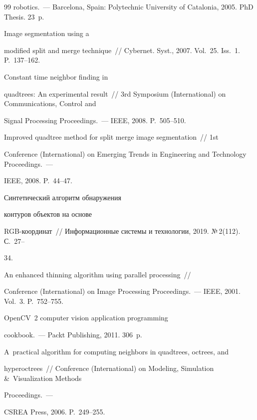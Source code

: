 {{\begin{thebibliography}{99}
robotics.~--- Barcelona, Spain: Polytechnic University of Catalonia, 2005.  PhD Thesis. 23~p.


 Image segmentation using a 

modified split and merge technique~/\!\!/ Cybernet. Syst., 2007. Vol.~25. Iss.~1. P.~137--162.


 Constant time neighbor finding in 

quadtrees: An experimental result~/\!\!/ 3rd  Symposium (International) on Communications, Control and 

Signal Processing Proceedings.~--- IEEE, 2008. P.~505--510.




 Improved quadtree method for split merge image segmentation~/\!\!/ 1st 

Conference (International) on Emerging Trends in Engineering and Technology Proceedings.~---

IEEE, 2008. P.~44--47.


 Синтетический алгоритм обнаружения 

контуров объектов на основе  

RGB-ко\-ор\-ди\-нат~/\!\!/ Информационные системы и технологии, 2019. №\,2(112). С.~27--

34.


 An enhanced thinning algorithm using parallel processing~/\!\!/ 

Conference (International) on Image Processing Proceedings.~--- IEEE, 2001. Vol.~3. P.~752--755.


 OpenCV~2 computer vision application programming 

cookbook.~--- Packt Publishing, 2011. 306~p.


 A~practical algorithm for computing neighbors in quadtrees, octrees, and 

hyperoctrees~/\!\!/  Conference (International) on Modeling, Simulation \&~Visualization Methods

Proceedings.~--- 

CSREA Press, 2006. P.~249--255.

\end{thebibliography}

} }





